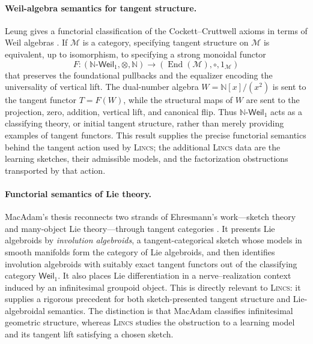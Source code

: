 \documentclass{article}
\begin{document}
\paragraph{Weil-algebra semantics for tangent structure.}
Leung gives a functorial classification of the Cockett--Cruttwell axioms in
terms of Weil algebras \citep[Thm.~14.1]{leung2017classifying}.  If $\mathcal
M$ is a category, specifying tangent structure on $\mathcal M$ is equivalent,
up to isomorphism, to specifying a strong monoidal functor
\[
F:(\mathbb N\text{-}\mathsf{Weil}_1,\otimes,\mathbb N)
  \longrightarrow
  (\operatorname{End}(\mathcal M),\circ,1_{\mathcal M})
\]
that preserves the foundational pullbacks and the equalizer encoding the
universality of vertical lift.  The dual-number algebra
$W=\mathbb N[x]/(x^2)$ is sent to the tangent functor $T=F(W)$, while the
structural maps of $W$ are sent to the projection, zero, addition, vertical
lift, and canonical flip.  Thus $\mathbb N\text{-}\mathsf{Weil}_1$ acts as a
classifying theory, or initial tangent structure, rather than merely providing
examples of tangent functors.  This result supplies the precise functorial
semantics behind the tangent action used by \textsc{Lincs}; the additional
\textsc{Lincs} data are the learning sketches, their admissible models, and the
factorization obstructions transported by that action.

\paragraph{Functorial semantics of Lie theory.}
MacAdam's thesis reconnects two strands of Ehresmann's work---sketch theory
and many-object Lie theory---through tangent categories
\citep{macadam2022functorial}.  It presents Lie algebroids by
\emph{involution algebroids}, a tangent-categorical sketch whose models in
smooth manifolds form the category of Lie algebroids, and then identifies
involution algebroids with suitably exact tangent functors out of the
classifying category $\mathsf{Weil}_1$.  It also places Lie differentiation in
a nerve--realization context induced by an infinitesimal groupoid object.
This is directly relevant to \textsc{Lincs}: it supplies a rigorous precedent
for both sketch-presented tangent structure and Lie-algebroidal semantics.
The distinction is that MacAdam classifies infinitesimal geometric structure,
whereas \textsc{Lincs} studies the obstruction to a learning model and its
tangent lift satisfying a chosen sketch.
\end{document}
